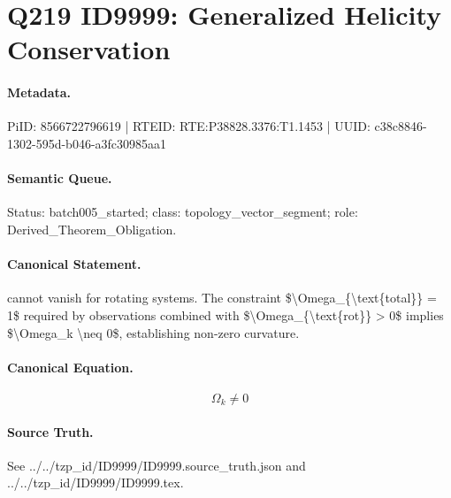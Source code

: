 \section*{Q219 ID9999: Generalized Helicity Conservation}
\paragraph{Metadata.}
PiID: 8566722796619 | RTEID: RTE:P38828.3376:T1.1453 | UUID: c38c8846-1302-595d-b046-a3fc30985aa1

\paragraph{Semantic Queue.}
Status: batch005\_started; class: topology\_vector\_segment; role: Derived\_Theorem\_Obligation.

\paragraph{Canonical Statement.}
cannot vanish for rotating systems. The constraint \$\textbackslash{}Omega\_\{\textbackslash{}text\{total\}\} = 1\$ required by observations combined with \$\textbackslash{}Omega\_\{\textbackslash{}text\{rot\}\} > 0\$ implies \$\textbackslash{}Omega\_k \textbackslash{}neq 0\$, establishing non-zero curvature.

\paragraph{Canonical Equation.}
\[
\Omega_k \neq 0
\]

\paragraph{Source Truth.}
See ../../tzp\_id/ID9999/ID9999.source\_truth.json and ../../tzp\_id/ID9999/ID9999.tex.
